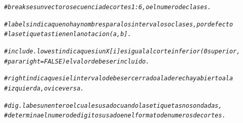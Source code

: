 \documentclass[12pt,letterpaper]{article}\usepackage[]{graphicx}\usepackage[]{color}
\makeatletter
\newcommand{\hlcom}[1]{\textcolor[rgb]{0.678,0.584,0.686}{\textit{#1}}}%
\newenvironment{kframe}{%
 \def\at@end@of@kframe{}%
 \ifinner\ifhmode%
  \def\at@end@of@kframe{\end{minipage}}%
  \begin{minipage}{\columnwidth}%
 \fi\fi%
 \def\FrameCommand##1{\hskip\@totalleftmargin \hskip-\fboxsep
 \colorbox{shadecolor}{##1}\hskip-\fboxsep
     \hskip-\linewidth \hskip-\@totalleftmargin \hskip\columnwidth}%
 \MakeFramed {\advance\hsize-\width
   \@totalleftmargin\z@ \linewidth\hsize
   \@setminipage}}%
 {\par\unskip\endMakeFramed%
 \at@end@of@kframe}
\newenvironment{knitrout}{}{} %
\makeatother
\begin{document}
\begin{enumerate}
\begin{knitrout}
\color{fgcolor}\begin{kframe}
\begin{alltt}
\hlcom{# breakses un vector o secuencia de cortes 1:6, o el numero de clases.}
\end{alltt}
\end{kframe}
\end{knitrout}
\begin{knitrout}
\color{fgcolor}\begin{kframe}
\begin{alltt}
\hlcom{# labelsindica que no hay nombres para los intervalos o clases, por defecto }
\hlcom{# las etiquetas tienen la notacion (a, b].}
\end{alltt}
\end{kframe}
\end{knitrout}
\begin{knitrout}
\color{fgcolor}\begin{kframe}
\begin{alltt}
\hlcom{# include.lowestindica que si un X[i] es igual al corte inferior (0 superior, }
\hlcom{# para right=FALSE) el valor debe ser incluido.}
\end{alltt}
\end{kframe}
\end{knitrout}
\begin{knitrout}
\color{fgcolor}\begin{kframe}
\begin{alltt}
\hlcom{# rightindica que si el intervalo debe ser cerradoa la derecha y abierto a la}
\hlcom{# izquierda, o viceversa. }
\end{alltt}
\end{kframe}
\end{knitrout}
\begin{knitrout}
\color{fgcolor}\begin{kframe}
\begin{alltt}
\hlcom{# dig.labes un entero el cual es usado cuando las etiquetas no son dadas,}
\hlcom{# determina el numero de digitos usado en el formato de numeros de cortes. }
\end{alltt}
\end{kframe}
\end{knitrout}


\end{enumerate}
\end{document}
